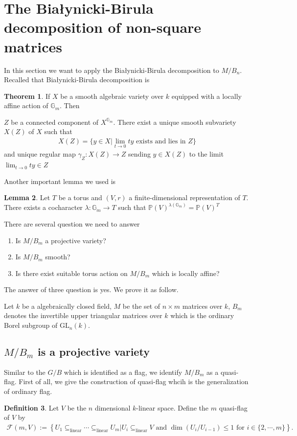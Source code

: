 \documentclass[10pt,UTF8]{article}
\theoremstyle{definition}
\newcommand{\gl}{\text{GL}}
\newtheorem{definition}{Definition}[section]
\newtheorem{theorem}[definition]{Theorem}
\newtheorem{lemma}[definition]{Lemma}
\begin{document}
\section{The Białynicki-Birula decomposition of non-square matrices}
In this section we want to apply the Białynicki-Birula decomposition to $M/B_n$. 
Recalled that Białynicki-Birula decomposition is 
\begin{theorem}
  If $X$ be a smooth algebraic variety over $k$ equipped with a locally affine action of $\mathbb{G}_m$.
  Then
    \item $Z$ be a connected component of $X^{\mathbb{G}_m}$. There exist a unique smooth subvariety $X(Z)$ of $X$ such that
    \begin{align*}
      X(Z) = \{y\in X|\lim_{t\to 0} ty\text{ exists and lies in }Z  \}
    \end{align*}
    and unique regular map $\gamma_Z:X(Z)\to Z$ sending $y\in X(Z)$ to the limit $\lim_{t\to 0}ty\in Z$
\end{theorem}

Another important lemma we used is 
\begin{lemma}
  Let $T$ be a torus and $(V,r)$ a finite-dimensional representation of $T$. There exists a cocharacter $\lambda:\mathbb{G}_m\to T$ such that $\mathbb{P}(V)^{\lambda(\mathbb{G}_m)}=\mathbb{P}(V)^T$
\end{lemma}

There are several question we need to answer
\begin{enumerate}
  \item Is $M/B_m$ a projective variety?
  \item Is $M/B_m$ smooth?
  \item Is there exist suitable torus action on $M/B_m$ which is locally affine?
\end{enumerate}
The answer of three question is yes.
We prove it as follow.

Let $k$ be a algebraically closed field, $M$ be the set of $n\times m$ matrices over $k$, 
$B_m$ denotes the invertible upper triangular matrices over $k$ which is the ordinary Borel subgroup of $\gl_n(k)$.
\subsection{$M/B_m$ is a projective variety}

Similar to the $G/B$ which is identified as a flag, we identify $M/B_m$ as a quasi-flag.
First of all, we give the construction of quasi-flag whcih is the generalization of ordinary flag.
\begin{definition}
  Let $V$ be the $n$ dimensional $k$-linear space. Define the $m$ quasi-flag of $V$ by 
  \begin{align*}
    \mathcal{F}(m,V) := \left\{  U_1\subseteq_{\text{linear}} \cdots \subseteq_{\text{linear}} U_m|\text{$U_i\subseteq_{\text{linear}} V$ and $\dim(U_i/U_{i-1})\le 1$ for $i\in\{2,\cdots,m\}$} \right\}.
  \end{align*}
\end{definition}
\end{document}
